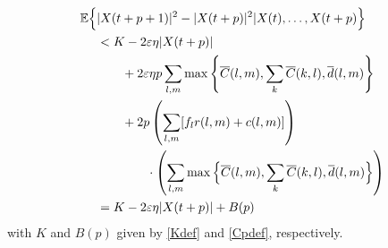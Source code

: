 \begin{align} \nonumber
\mathbb{E}\Big\{ &\vert X(t + p +  1)\vert^2 - \vert  X(t + p)\vert^2 \vert X(t),\ldots,X(t + p) \Big\}  \\ \nonumber
&<  K  -2 \varepsilon \eta \vert X(t + p) \vert \\ \nonumber
&\qquad + 2\varepsilon \eta p \sum_{l,m} \max\left\{ \overline{C}(l,m),\sum_{k}\overline{C}(k,l),\overline d(l,m) \right\}  \\ \nonumber
&  \qquad  + 2 p \left(\sum_{l,m}[f_{l}r(l,m) + c(l,m)]\right) \\ \nonumber
& \qquad \qquad \cdot \left( \sum_{l,m} \max\Big\{  \overline{C}(l,m), \sum_{k}\overline{C}(k,l), \overline{d}(l,m)\Big\} \right) \\
&= K  -2 \varepsilon \eta \vert X(t + p) \vert + B(p)
\end{align}
with $K$ and $B(p)$ given by \eqref{Kdef} and \eqref{Cpdef}, respectively. 
